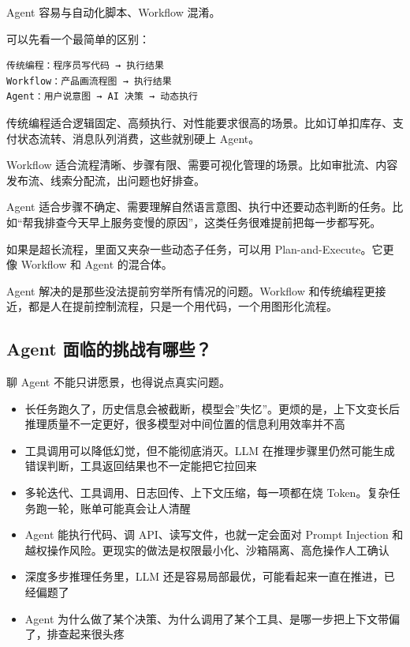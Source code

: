 \documentclass[9pt,a4paper,twocolumn]{ctexart}
\begin{document}
Agent 容易与自动化脚本、Workflow 混淆。



可以先看一个最简单的区别：



\begin{lstlisting}
传统编程：程序员写代码 → 执行结果
Workflow：产品画流程图 → 执行结果
Agent：用户说意图 → AI 决策 → 动态执行
\end{lstlisting}



传统编程适合逻辑固定、高频执行、对性能要求很高的场景。比如订单扣库存、支付状态流转、消息队列消费，这些就别硬上 Agent。



Workflow 适合流程清晰、步骤有限、需要可视化管理的场景。比如审批流、内容发布流、线索分配流，出问题也好排查。



Agent 适合步骤不确定、需要理解自然语言意图、执行中还要动态判断的任务。比如“帮我排查今天早上服务变慢的原因”，这类任务很难提前把每一步都写死。



如果是超长流程，里面又夹杂一些动态子任务，可以用 Plan-and-Execute。它更像 Workflow 和 Agent 的混合体。



Agent 解决的是那些没法提前穷举所有情况的问题。Workflow 和传统编程更接近，都是人在提前控制流程，只是一个用代码，一个用图形化流程。



\subsection*{Agent 面临的挑战有哪些？}


聊 Agent 不能只讲愿景，也得说点真实问题。


\begin{itemize}[itemsep=1pt, topsep=2pt]
  \item 长任务跑久了，历史信息会被截断，模型会”失忆”。更烦的是，上下文变长后推理质量不一定更好，很多模型对中间位置的信息利用效率并不高
  \item 工具调用可以降低幻觉，但不能彻底消灭。LLM 在推理步骤里仍然可能生成错误判断，工具返回结果也不一定能把它拉回来
  \item 多轮迭代、工具调用、日志回传、上下文压缩，每一项都在烧 Token。复杂任务跑一轮，账单可能真会让人清醒
  \item Agent 能执行代码、调 API、读写文件，也就一定会面对 Prompt Injection 和越权操作风险。更现实的做法是权限最小化、沙箱隔离、高危操作人工确认
  \item 深度多步推理任务里，LLM 还是容易局部最优，可能看起来一直在推进，已经偏题了
  \item Agent 为什么做了某个决策、为什么调用了某个工具、是哪一步把上下文带偏了，排查起来很头疼
\end{itemize}
\end{document}
